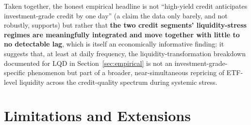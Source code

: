 \documentclass[11pt]{article}
\theoremstyle{definition}
\theoremstyle{remark}
\begin{document}
Taken together, the honest empirical headline is not ``high-yield credit anticipates investment-grade credit by one day'' (a claim the data only barely, and not robustly, supports) but rather that \textbf{the two credit segments' liquidity-stress regimes are meaningfully integrated and move together with little to no detectable lag}, which is itself an economically informative finding: it suggests that, at least at daily frequency, the liquidity-transformation breakdown documented for LQD in Section~\ref{sec:empirical} is not an investment-grade-specific phenomenon but part of a broader, near-simultaneous repricing of ETF-level liquidity across the credit-quality spectrum during systemic stress.

\section{Limitations and Extensions}
\label{sec:limitations}
\end{document}
